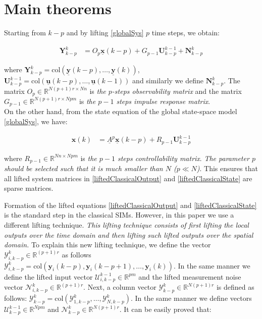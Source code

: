 \documentclass[journal,10pt]{IEEEtran}
\begin{document}
\section{Main theorems}
\label{mainTheorems}
Starting from $k-p$ and by lifting \eqref{globalSys} $p$ time steps, we obtain:
\begin{small}
\begin{align}
\mathbf{Y}_{k-p}^{k}&=O_{p}\underline{\mathbf{x}}(k-p)+G_{p-1} \mathbf{U}_{k-p}^{k-1}+\mathbf{N}_{k-p}^{k} \label{liftedClassicalOutput}
\end{align}
\end{small}
where $\mathbf{Y}_{k-p}^{k}=\text{col}\left(\underline{\mathbf{y}}(k-p),\ldots,\underline{\mathbf{y}}(k)\right)$, $\mathbf{U}_{k-p}^{k-1}=\text{col}\left(\underline{\mathbf{u}}(k-p),\ldots,\underline{\mathbf{u}}(k-1)\right)$ and similarly we define $\mathbf{N}_{k-p}^{k}$. The matrix $O_{p}\in \mathbb{R}^{N(p+1)r\times Nn}$ is \textit{the $p$-steps observability matrix} and the matrix $G_{p-1}\in \mathbb{R}^{N(p+1)r\times Npm}$ is \textit{the $p-1$ steps impulse response matrix}\cite{verhaegen2007}. \\
On the other hand, from the state equation of the global state-space model \eqref{globalSys}, we have:
\begin{small}
\begin{align}
\mathbf{x}(k)&=\underline{A}^{p}\underline{\mathbf{x}}(k-p)+R_{p-1}
\mathbf{U}_{k-p}^{k-1} \label{liftedClassicalState}
\end{align}
\end{small}
where $R_{p-1}\in \mathbb{R}^{Nn\times Npm} $ is \textit{the $p-1$ steps controllability matrix}. \textit{The parameter $p$ should be selected such that it is much smaller than $N$ ($p\ll N$)}. This ensures that all lifted system matrices in \eqref{liftedClassicalOutput} and \eqref{liftedClassicalState} are sparse matrices.
\par
 Formation of the lifted equations \eqref{liftedClassicalOutput} and \eqref{liftedClassicalState} is the standard step in the classical SIMs. However, in this paper we use a different lifting technique. \textit{This lifting technique consists of first lifting the local outputs over the time domain and then lifting such lifted outputs over the spatial domain.} To explain this new lifting technique, we define the vector $\mathcal{Y}_{i,k-p}^{k}\in \mathbb{R}^{(p+1)r}$ as follows $\mathcal{Y}_{i,k-p}^{k}=\text{col}(\mathbf{y}_{i}(k-p),\mathbf{y}_{i}(k-p+1),\ldots,\mathbf{y}_{i}(k))$. In the same manner we define the lifted input vector $\mathcal{U}_{i,k-p}^{k-1}\in \mathbb{R}^{pm}$ and the lifted measurement noise vector $\mathcal{N}_{i,k-p}^{k}\in \mathbb{R}^{(p+1)r}$. Next, a column vector $\mathcal{Y}_{k-p}^{k}\in \mathbb{R}^{N(p+1)r}$ is defined as follows: $\mathcal{Y}_{k-p}^{k}=\text{col}(\mathcal{Y}_{1,k-p}^{k},\ldots,\mathcal{Y}_{N,k-p}^{k})$. In the same manner we define vectors $\mathcal{U}_{k-p}^{k-1}\in \mathbb{R}^{Npm}$ and $\mathcal{N}_{k-p}^{k}\in \mathbb{R}^{N(p+1)r}$. It can be easily proved that:
\end{document}
